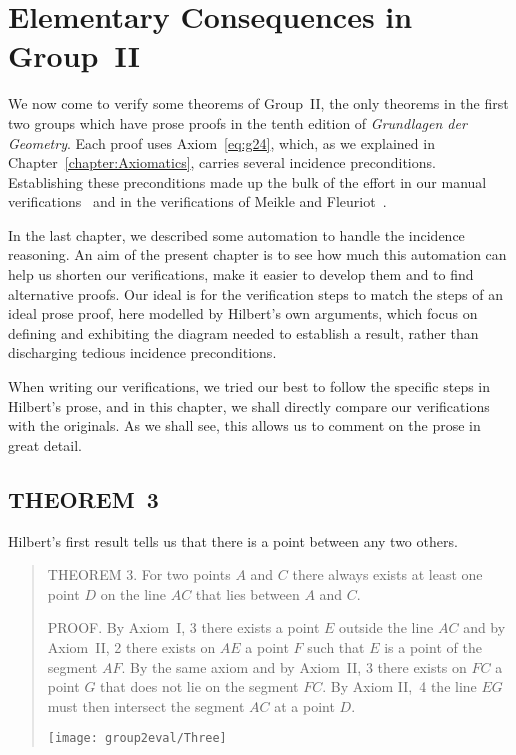 \chapter{Elementary Consequences in Group~II}\label{chapter:Group2Eval}
We now come to verify some theorems of Group~II, the only theorems in the first two groups which have prose proofs in the tenth edition of \emph{Grundlagen der Geometry}. Each proof uses Axiom~\ref{eq:g24}, which, as we explained in Chapter~\ref{chapter:Axiomatics}, carries several incidence preconditions. Establishing these preconditions made up the bulk of the effort in our manual verifications~\cite{ScottMScThesis} and in the verifications of Meikle and Fleuriot~\cite{MeikleFleuriotFormalizingHilbert}.

In the last chapter, we described some automation to handle the incidence reasoning.
An aim of the present chapter is to see how much this automation can help us shorten
our verifications, make it easier to develop them and to find alternative proofs. Our ideal is for the verification steps to match the steps of an ideal prose proof, here modelled by Hilbert’s own arguments, which focus on defining and exhibiting the diagram needed to establish a result, rather than discharging tedious incidence preconditions.

When writing our verifications, we tried our best to follow the specific steps in Hilbert's prose, and in this chapter, we shall directly compare our verifications with the originals. As we shall see, this allows us to comment on the prose in great detail.

\section{THEOREM~3}\label{sec:Theorem3}
Hilbert's first result tells us that there is a point between any two others.

\begin{quotation}
THEOREM 3. For two points $A$ and $C$ there always exists at least one point $D$ on the line $AC$ that lies between $A$ and $C$.

PROOF. By Axiom~I, 3 there exists a point $E$ outside the line $AC$ and by Axiom~II, 2 there exists on $AE$ a point $F$ such that $E$ is a point of the segment $AF$. By the same axiom and by Axiom~II, 3 there exists on $FC$ a point $G$ that does not lie on the segment $FC$. By Axiom II,~4 the line $EG$ must then intersect the segment $AC$ at a point $D$.

\vspace{0.5cm}
\centering\texttt{[image: group2eval/Three]}
\end{quotation}

